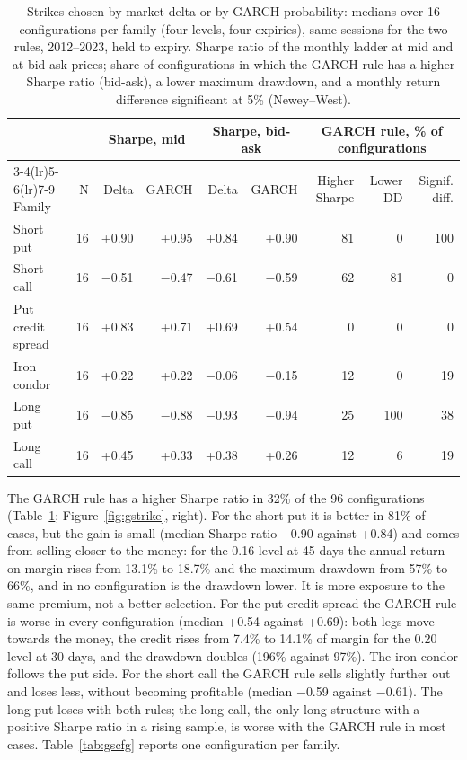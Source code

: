 \documentclass[11pt,a4paper]{article}
\begin{document}
\begin{table}[ht]\centering\footnotesize
\caption{Strikes chosen by market delta or by GARCH probability: medians over 16 configurations per family (four levels, four expiries), same sessions for the two rules, 2012--2023, held to expiry. Sharpe ratio of the monthly ladder at mid and at bid-ask prices; share of configurations in which the GARCH rule has a higher Sharpe ratio (bid-ask), a lower maximum drawdown, and a monthly return difference significant at 5\% (Newey--West).}\label{tab:gsfam}
\begin{tabular}{lrrrrrrrr}\toprule
 & & \multicolumn{2}{c}{Sharpe, mid} & \multicolumn{2}{c}{Sharpe, bid-ask} & \multicolumn{3}{c}{GARCH rule, \% of configurations} \\ \cmidrule(lr){3-4}\cmidrule(lr){5-6}\cmidrule(lr){7-9}
Family & N & Delta & GARCH & Delta & GARCH & Higher Sharpe & Lower DD & Signif. diff. \\ \midrule
Short put & 16 & +0.90 & +0.95 & +0.84 & +0.90 & 81 & 0 & 100 \\
Short call & 16 & $-$0.51 & $-$0.47 & $-$0.61 & $-$0.59 & 62 & 81 & 0 \\
Put credit spread & 16 & +0.83 & +0.71 & +0.69 & +0.54 & 0 & 0 & 0 \\
Iron condor & 16 & +0.22 & +0.22 & $-$0.06 & $-$0.15 & 12 & 0 & 19 \\
Long put & 16 & $-$0.85 & $-$0.88 & $-$0.93 & $-$0.94 & 25 & 100 & 38 \\
Long call & 16 & +0.45 & +0.33 & +0.38 & +0.26 & 12 & 6 & 19 \\
\bottomrule\end{tabular}\end{table}

The GARCH rule has a higher Sharpe ratio in 32\% of the 96 configurations (Table~\ref{tab:gsfam}; Figure~\ref{fig:gstrike}, right). For the short put it is better in 81\% of cases, but the gain is small (median Sharpe ratio +0.90 against +0.84) and comes from selling closer to the money: for the 0.16 level at 45 days the annual return on margin rises from 13.1\% to 18.7\% and the maximum drawdown from 57\% to 66\%, and in no configuration is the drawdown lower. It is more exposure to the same premium, not a better selection. For the put credit spread the GARCH rule is worse in every configuration (median +0.54 against +0.69): both legs move towards the money, the credit rises from 7.4\% to 14.1\% of margin for the 0.20 level at 30 days, and the drawdown doubles (196\% against 97\%). The iron condor follows the put side. For the short call the GARCH rule sells slightly further out and loses less, without becoming profitable (median $-$0.59 against $-$0.61). The long put loses with both rules; the long call, the only long structure with a positive Sharpe ratio in a rising sample, is worse with the GARCH rule in most cases. Table~\ref{tab:gscfg} reports one configuration per family.
\end{document}
